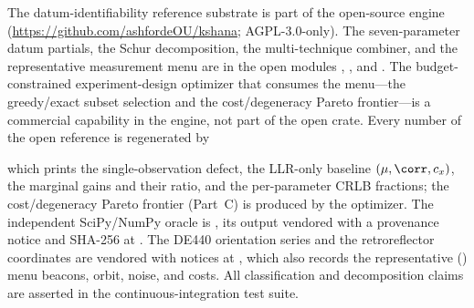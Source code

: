 \label{sec:availability}
The datum-identifiability reference substrate is part of the open-source
 engine \citep{baweja2026kshana}
(\url{https://github.com/ashfordeOU/kshana}; AGPL-3.0-only). The seven-parameter
datum partials, the Schur decomposition, the multi-technique combiner, and the
representative measurement menu are in the open modules ,
, and . The budget-constrained
experiment-design optimizer that consumes the menu---the greedy/exact subset
selection and the cost/degeneracy Pareto frontier---is a commercial capability in
the  engine, not part of the open crate. Every number of the open
reference is regenerated by
\begin{quote}
\end{quote}
which prints the single-observation defect, the LLR-only baseline
$(\mu,\corr,c_x)$, the marginal gains and their ratio, and the per-parameter CRLB
fractions; the cost/degeneracy Pareto frontier (Part~C) is produced by the
 optimizer. The independent SciPy/NumPy oracle is
, its output vendored with a
provenance notice and SHA-256 at . The
DE440 orientation series and the retroreflector coordinates are vendored with
notices at , which also records the
representative (\Modelled) menu beacons, orbit, noise, and costs. All classification
and decomposition claims are asserted in the continuous-integration test suite.
